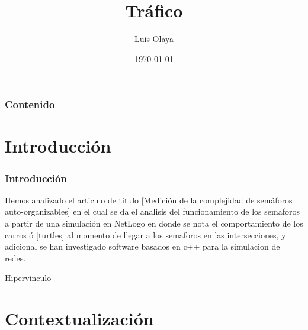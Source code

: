 \documentclass{beamer}
\title[Trafico]{Tráfico} %
\author{Luis Olaya} %
\institute[UPA] %
{
Universidad de Pamplona \\ %

}
\date{\today} %
\begin{document}
\justifying 

\begin{frame}
\titlepage %
\end{frame}

\begin{frame}
	\frametitle{Contenido} %
	\tableofcontents %
\end{frame}

\section{Introducción} %


\begin{frame}
	\frametitle{Introducción}
	
	\justifying 
	Hemos  analizado el articulo de titulo [Medición de la complejidad de semáforos auto-organizables] en el cual se da el analisis del funcionamiento de los semaforos a partir de una simulación en NetLogo en donde se nota el comportamiento de los carros ó [turtles] al momento de llegar a los semaforos en las intersecciones, y adicional se han investigado software basados en c++ para la simulacion de redes. 
	
	\href{https://es.wikipedia.org/wiki/IEEE_802.15}{Hipervinculo}
\end{frame}

\section{Contextualización} 
\end{document}
